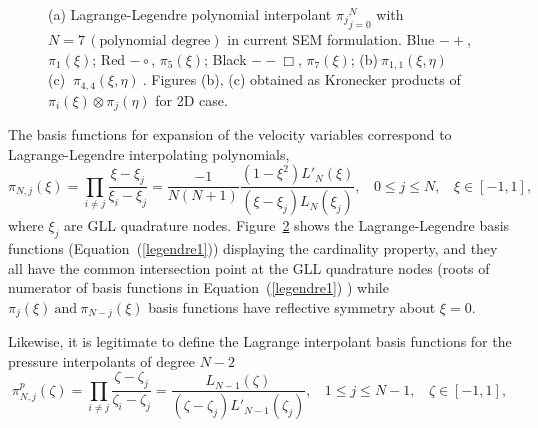 \begin{figure}
\begin{subfigure}[b]{0.45\textwidth}
                 \caption{}
                 \label{fig:poly3}
         \end{subfigure}
        \caption[Lagrange-Legendre polynomial interpolants: $N = 7$]{(a) Lagrange-Legendre polynomial interpolant ${\pi_j}_{j=0}^{N}$ with $N = 7\,(\mbox{polynomial degree})$ in current SEM formulation. Blue $-+$,   $\pi_1(\xi)$;  Red $-\circ$,  $\pi_5(\xi)$;  Black $--\Box$,  $\pi_7(\xi)$; (b)$\  \pi_{1,1}(\xi,\eta) \ \ $ (c) $\  \pi_{4,4}(\xi,\eta) \ $. Figures (b), (c) obtained as Kronecker products of $\pi_{i}(\xi)\otimes \pi_{j}(\eta)$ for 2D case.}\label{fig:figure_legpoly1}
\end{figure}
The basis functions for expansion of the velocity variables correspond to Lagrange-Legendre interpolating polynomials,
\begin{equation}
\pi_{N,j}(\xi) = \prod_{i\neq j}\frac{\xi - \xi_j}{\xi_i - \xi_j} =  \frac{-1}{N(N+1)}\frac{(1-\xi^{2})L'_{N}(\xi)}{(\xi - \xi_j)L_N(\xi_j)}, \ \  \  \   0 \leq j \leq N, \  \  \ \  \xi \in [-1,1],  \label{legendre1}
\end{equation}
where $\xi_j$ are GLL quadrature nodes. Figure~\ref{fig:figure_legpoly1} shows the Lagrange-Legendre basis functions (Equation~(\ref{legendre1})) displaying the cardinality property, and they all have the common intersection point at the GLL quadrature nodes (roots of numerator of basis functions in Equation~(\ref{legendre1}) ) while $\pi_{j}(\xi) \ \mbox{and} \ \pi_{N-j}(\xi)$ basis functions have reflective symmetry about $\xi = 0$.

Likewise, it is legitimate to define the Lagrange interpolant basis functions for the pressure interpolants of degree $N-2$
\begin{equation}
\pi^{p}_{N,j}(\zeta) = \prod_{i\neq j}\frac{\zeta - \zeta_j}{\zeta_i - \zeta_j} = \frac{L_{N-1}(\zeta)}{(\zeta - \zeta_j)L'_{N-1}(\zeta_j)} , \ \  \  \   1 \leq j \leq N-1, \  \  \ \  \zeta \in [-1,1],  \label{legendre2}
\end{equation} 

